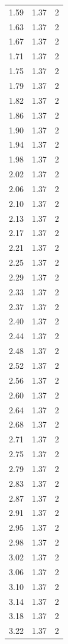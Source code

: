 \begin{longtable}{lrr}
  1.59 & 1.37 & 2 \\
  1.63 & 1.37 & 2 \\
  1.67 & 1.37 & 2 \\
  1.71 & 1.37 & 2 \\
  1.75 & 1.37 & 2 \\
  1.79 & 1.37 & 2 \\
  1.82 & 1.37 & 2 \\
  1.86 & 1.37 & 2 \\
  1.90 & 1.37 & 2 \\
  1.94 & 1.37 & 2 \\
  1.98 & 1.37 & 2 \\
  2.02 & 1.37 & 2 \\
  2.06 & 1.37 & 2 \\
  2.10 & 1.37 & 2 \\
  2.13 & 1.37 & 2 \\
  2.17 & 1.37 & 2 \\
  2.21 & 1.37 & 2 \\
  2.25 & 1.37 & 2 \\
  2.29 & 1.37 & 2 \\
  2.33 & 1.37 & 2 \\
  2.37 & 1.37 & 2 \\
  2.40 & 1.37 & 2 \\
  2.44 & 1.37 & 2 \\
  2.48 & 1.37 & 2 \\
  2.52 & 1.37 & 2 \\
  2.56 & 1.37 & 2 \\
  2.60 & 1.37 & 2 \\
  2.64 & 1.37 & 2 \\
  2.68 & 1.37 & 2 \\
  2.71 & 1.37 & 2 \\
  2.75 & 1.37 & 2 \\
  2.79 & 1.37 & 2 \\
  2.83 & 1.37 & 2 \\
  2.87 & 1.37 & 2 \\
  2.91 & 1.37 & 2 \\
  2.95 & 1.37 & 2 \\
  2.98 & 1.37 & 2 \\
  3.02 & 1.37 & 2 \\
  3.06 & 1.37 & 2 \\
  3.10 & 1.37 & 2 \\
  3.14 & 1.37 & 2 \\
  3.18 & 1.37 & 2 \\
  3.22 & 1.37 & 2 \\

\end{longtable}

